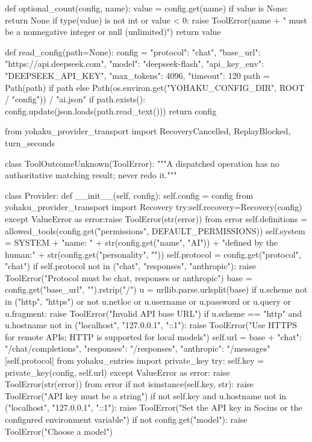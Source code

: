 def optional_count(config, name):
    value = config.get(name)
    if value is None:
        return None
    if type(value) is not int or value < 0:
        raise ToolError(name + " must be a nonnegative integer or null (unlimited)")
    return value

def read_config(path=None):
    config = {"protocol": "chat", "base_url": "https://api.deepseek.com", "model": "deepseek-flash",
        "api_key_env": "DEEPSEEK_API_KEY", "max_tokens": 4096, "timeout": 120}
    path = Path(path) if path else Path(os.environ.get("YOHAKU_CONFIG_DIR", ROOT / "config")) / "ai.json"
    if path.exists():
        config.update(json.loads(path.read_text()))
    return config

from yohaku_provider_transport import RecoveryCancelled, ReplayBlocked, turn_seconds

class ToolOutcomeUnknown(ToolError):
    """A dispatched operation has no authoritative matching result; never redo it."""

class Provider:
    def __init__(self, config):
        self.config = config
        from yohaku_provider_transport import Recovery
        try:self.recovery=Recovery(config)
        except ValueError as error:raise ToolError(str(error)) from error
        self.definitions = allowed_tools(config.get("permissions", DEFAULT_PERMISSIONS))
        self.system = SYSTEM + "\nAI name: " + str(config.get("name", "AI")) + "\nPersonality defined by the human:\n" + str(config.get("personality", ""))
        self.protocol = config.get("protocol", "chat")
        if self.protocol not in ("chat", "responses", "anthropic"):
            raise ToolError("Protocol must be chat, responses or anthropic")
        base = config.get("base_url", "").rstrip("/")
        u = urllib.parse.urlsplit(base)
        if u.scheme not in ("http", "https") or not u.netloc or u.username or u.password or u.query or u.fragment:
            raise ToolError("Invalid API base URL")
        if u.scheme == "http" and u.hostname not in ("localhost", "127.0.0.1", "::1"):
            raise ToolError("Use HTTPS for remote APIs; HTTP is supported for local models")
        self.url = base + {"chat": "/chat/completions", "responses": "/responses", "anthropic": "/messages"}[self.protocol]
        from yohaku_entries import private_key
        try:
            self.key = private_key(config, self.url)
        except ValueError as error:
            raise ToolError(str(error)) from error
        if not isinstance(self.key, str):
            raise ToolError("API key must be a string")
        if not self.key and u.hostname not in ("localhost", "127.0.0.1", "::1"):
            raise ToolError("Set the API key in Socius or the configured environment variable")
        if not config.get("model"):
            raise ToolError("Choose a model")

